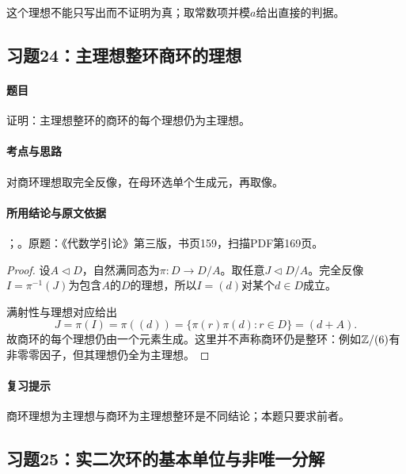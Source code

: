 这个理想不能只写出而不证明为真；取常数项并模$a$给出直接的判据。

\subsection{习题24：主理想整环商环的理想}

\label{ex:4:24}

\paragraph{题目}

证明：主理想整环的商环的每个理想仍为主理想。

\paragraph{考点与思路}

对商环理想取完全反像，在母环选单个生成元，再取像。

\paragraph{所用结论与原文依据}

；。原题：《代数学引论》第三版，书页159，扫描PDF第169页。


\begin{proof}

设$A\lhd D$，自然满同态为$\pi:D\to D/A$。取任意$J\lhd D/A$。完全反像$I=\pi^{-1}(J)$为包含$A$的$D$的理想，所以$I=(d)$对某个$d\in D$成立。

满射性与理想对应给出
\[
J=\pi(I)=\pi((d))
=\{\pi(r)\pi(d):r\in D\}=(d+A).
\]
故商环的每个理想仍由一个元素生成。这里并不声称商环仍是整环：例如$\mathbb Z/(6)$有非零零因子，但其理想仍全为主理想。

\end{proof}

\paragraph{复习提示}

商环理想为主理想与商环为主理想整环是不同结论；本题只要求前者。

\subsection{习题25：实二次环的基本单位与非唯一分解}

